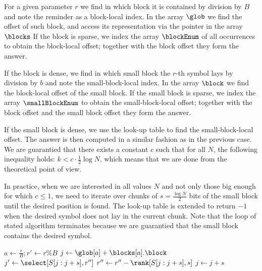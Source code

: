 For a given parameter $r$ we find in which block it is contained by division by $B$ and note the reminder as a block-local index.
In the array $\glob$ we find the offset of such block, and access its representation via the pointer in the array $\blocks$
If the block is sparse, we index the array $\blockEnum$ of all occurrences to obtain the block-local offset; together with the block offset they form the answer.

If the block is dense, we find in which small block the $r$-th symbol \ph{} lays by division by $b$ and note the small-block-local index.
In the array $\block$ we find the block-local offset of the small block.
If the small block is sparse, we index the array $\smallBlockEnum$ to obtain the small-block-local offset; together with the block offset and the small block offset they form the answer.

If the small block is dense, we use the look-up table to find the small-block-local offset.
The answer is then computed in a similar fashion as in the previous case.
We are guarantied that there exists a constant $c$ such that for all $N$, the following inequality holds: $k < c \cdot \frac{1}{2} \log N$, which means that we are done from the theoretical point of view.

In practice, when we are interested in all values $N$ and not only those big enough for which $c \le 1$, we need to iterate over chunks of $s = \frac{\log N}{2}$ bits of the small block until the desired position is found.
The look-up table is extended to return $-1$ when the desired symbol does not lay in the current chunk.
Note that the loop of stated algorithm terminates because we are guarantied that the small block contains the desired symbol.

\begin{algorithmic}
	\State $a \gets \frac{r}{B}; r' \gets r \% B$
		\State {}
	\Else
		\State $j \gets \glob[a] + \blocks[a].\block$
			\State {}
		\Else
			\While{$\true$}
				\State $j' \gets \select[S[j : j + s], r'']$
					\State $r'' \gets r'' - \rank[S[j : j + s], s]$
					\State $j \gets j + s$
				\Else
					\State {}
				\EndIf
			\EndWhile
		\EndIf
	\EndIf
\EndFunction
\end{algorithmic}

